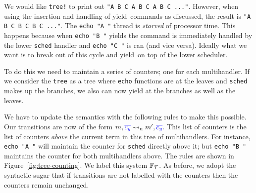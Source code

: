 \documentclass[msc,deptreport,cs]{infthesis} %
\newcommand{\code}[1]{\lstinline{#1}}
\newcommand\treefrank{$\mathbb{F}_{\cal{T}}$}
\newcommand{\counter}{{\color{blue}c_y}}
\newcommand{\bluetext}[1]{{\color{blue}#1}}
\newcommand\yield{\textsf{yield}\xspace}
\newcommand{\many}{\overline}
\newcommand{\redtou}{\leadsto_{\mathrm{u}}}
\begin{document}
We would like \code{tree!} to print out \code{"A B C A B C A B C ..."}. However, when
using the insertion and handling of \yield~commands as discussed, the result is
\code{"A B C B C B C ..."}. The \code{echo "A "} thread is \emph{starved} of
processor time. This happens because when \code{echo "B "} yields the command
is immediately handled by the lower \code{sched} handler and \code{echo "C "}
is ran (and vice versa). Ideally what we want is to break out of this cycle
and \yield~on top of the lower scheduler.

To do this we need to maintain a series of counters; one for each multihandler.
If we consider the \code{tree} as a tree where \code{echo} functions are at
the leaves and \code{sched} makes up the branches, we also can now yield at the
branches as well as the leaves.

We have to update the semantics with the following rules to make this possible.
Our transitions are now of the form $m, \bluetext{\many{\counter}} \redtou m',
\bluetext{\many{\counter}}$. This list of counters is the list of counters
\emph{above} the current term in this tree of multihandlers. For instance,
\code{echo "A "} will maintain the counter for \code{sched} directly above it;
but \code{echo "B "} maintains the counter for both multihandlers above. The
rules are shown in Figure~\ref{fig:tree-counting}. We label this system
\treefrank. As before, we adopt the syntactic sugar that if transitions are not
labelled with the counters then the counters remain unchanged.
\end{document}
